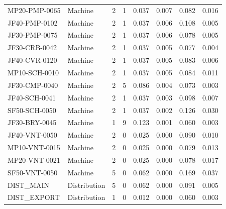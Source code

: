 \begin{longtable}{l l r r r r r r}
MP20-PMP-0065 & Machine & 2 & 1 & 0.037 & 0.007 & 0.082 & 0.016\\
JF40-PMP-0102 & Machine & 2 & 1 & 0.037 & 0.006 & 0.108 & 0.005\\
JF30-PMP-0075 & Machine & 2 & 1 & 0.037 & 0.006 & 0.078 & 0.005\\
JF30-CRB-0042 & Machine & 2 & 1 & 0.037 & 0.005 & 0.077 & 0.004\\
JF40-CVR-0120 & Machine & 2 & 1 & 0.037 & 0.005 & 0.083 & 0.006\\
MP10-SCH-0010 & Machine & 2 & 1 & 0.037 & 0.005 & 0.084 & 0.011\\
JF30-CMP-0040 & Machine & 2 & 5 & 0.086 & 0.004 & 0.073 & 0.003\\
JF40-SCH-0041 & Machine & 2 & 1 & 0.037 & 0.003 & 0.098 & 0.007\\
SF50-SCH-0050 & Machine & 2 & 1 & 0.037 & 0.002 & 0.126 & 0.030\\
JF30-BRY-0045 & Machine & 1 & 9 & 0.123 & 0.001 & 0.060 & 0.003\\
JF40-VNT-0050 & Machine & 2 & 0 & 0.025 & 0.000 & 0.090 & 0.010\\
MP10-VNT-0015 & Machine & 2 & 0 & 0.025 & 0.000 & 0.079 & 0.013\\
MP20-VNT-0021 & Machine & 2 & 0 & 0.025 & 0.000 & 0.078 & 0.017\\
SF50-VNT-0050 & Machine & 5 & 0 & 0.062 & 0.000 & 0.169 & 0.037\\
DIST\_MAIN & Distribution & 5 & 0 & 0.062 & 0.000 & 0.091 & 0.005\\
DIST\_EXPORT & Distribution & 1 & 0 & 0.012 & 0.000 & 0.060 & 0.003\\
\end{longtable}
